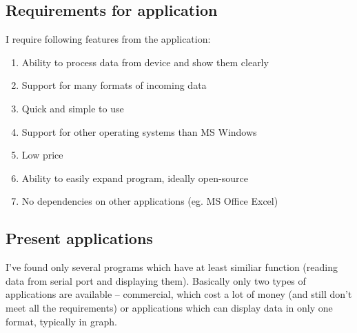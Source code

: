\documentclass[12pt, a4paper, oneside]{article}
\begin{document}
\subsection{Requirements for application}
\label{reqs}
I require following features from the application:
\begin{enumerate}
    \item Ability to process data from device and show them clearly %
    \item Support for many formats of incoming data%
    \item Quick and simple to use%
    \item Support for other operating systems than MS Windows %
    \item Low price%
    \item Ability to easily expand program, ideally open-source %
    \item No dependencies on other applications (eg. MS Office Excel) %
\end{enumerate}

\subsection{Present applications}
I've found only several programs which have at least similiar function (reading data from serial port and displaying them). Basically only two types of applications are available -- commercial, which cost a lot of money (and still don't meet all the requirements) or applications which can display data in only one format, typically in graph.
\end{document}
